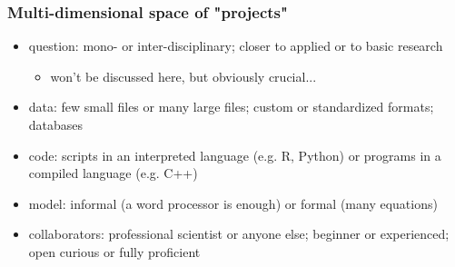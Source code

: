 \documentclass[c]{beamer} %
\begin{document}
\begin{frame}
  \frametitle{Multi-dimensional space of "projects"}
  \begin{itemize}
  \item \alert{question}: mono- or inter-disciplinary; closer to applied or to basic research
    \begin{itemize}
    \item won't be discussed here, but obviously crucial...
    \end{itemize}
    \medskip
    \pause
  \item \alert{data}: few small files or many large files; custom or standardized formats; databases
    \medskip
    \pause
  \item \alert{code}: scripts in an interpreted language (e.g. R, Python) or programs in a compiled language (e.g. C++)
    \medskip
    \pause
  \item \alert{model}: informal (a word processor is enough) or formal (many equations)
    \medskip
    \pause
  \item \alert{collaborators}: professional scientist or anyone else; beginner or experienced; open curious or fully proficient
  \end{itemize}
\end{frame}

  
  
  
  
\end{document}
